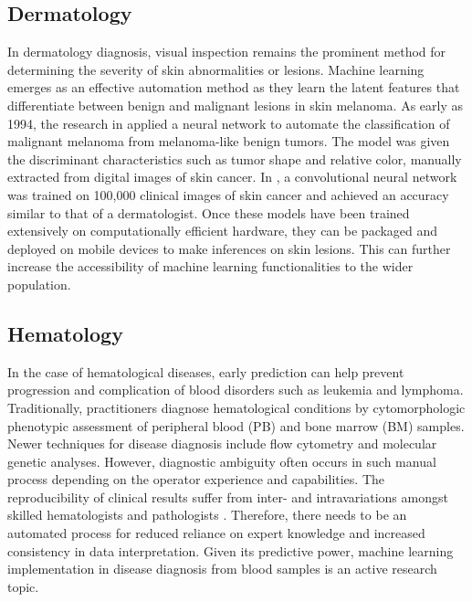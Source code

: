 \documentclass[a4paper]{article}
\begin{document}
\subsection{Dermatology}
In dermatology diagnosis, visual inspection remains the prominent method for determining the severity of skin abnormalities or lesions. 
Machine learning emerges as an effective automation method as they learn the latent features that differentiate between benign and malignant lesions in skin melanoma. 
As early as 1994, the research in \cite{ercal_neural_1994} applied a neural network to automate the classification of malignant melanoma from melanoma-like benign tumors.
The model was given the discriminant characteristics such as tumor shape and relative color, manually extracted from digital images of skin cancer.
In \cite{esteva_dermatologist-level_2017}, a convolutional neural network was trained on 100,000 clinical images of skin cancer and achieved an accuracy similar to that of a dermatologist.
Once these models have been trained extensively on computationally efficient hardware, they can be packaged and deployed on mobile devices to make inferences on skin lesions. 
This can further increase the accessibility of machine learning functionalities to the wider population.


\subsection{Hematology}
In the case of hematological diseases, early prediction can help prevent progression and complication of blood disorders such as leukemia and lymphoma. 
Traditionally, practitioners diagnose hematological conditions by cytomorphologic phenotypic assessment of peripheral blood (PB) and bone marrow (BM) samples.
Newer techniques for disease diagnosis include flow cytometry and molecular genetic analyses. 
However, diagnostic ambiguity often occurs in such manual process depending on the operator experience and capabilities. 
The reproducibility of clinical results suffer from inter- and intravariations amongst skilled hematologists and pathologists \cite{walter_artificial_2023,wu_hematologist-level_2020}.
Therefore, there needs to be an automated process for reduced reliance on expert knowledge and increased consistency in data interpretation.
Given its predictive power, machine learning implementation in disease diagnosis from blood samples is an active research topic.
\end{document}
